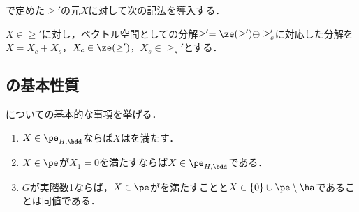 で定めた$\ge'$の元$X$に対して次の記法を導入する．
\begin{defi}
  $X\in \ge' $に対し，ベクトル空間としての分解$\ge' = \ze(\ge') \oplus \ge_{s}' $に対応した分解を$X = X_c + X_s $，$X_c \in \ze(\ge')$，$X_s\in \ge_{s}'$とする．
\end{defi}

\subsection{の基本性質}
についての基本的な事項を挙げる．

\begin{prop}\label{lem:basic-prob}
  \leavevmode\vspace{-1em}
  \begin{enumerate}[label=\textbf{\arabic*.}]
  \item $X\in \pe_{H,\bdd} $ならば$X$はを満たす．
  \item $X \in \pe $が$X_1 = 0$を満たすならば$X\in \pe_{H,\bdd} $である．
  \item $G$が実階数1ならば，$X\in\pe$がを満たすことと$X\in \{0\}\cup \pe\setminus\ha $であることは同値である．
  \end{enumerate}
\end{prop}


